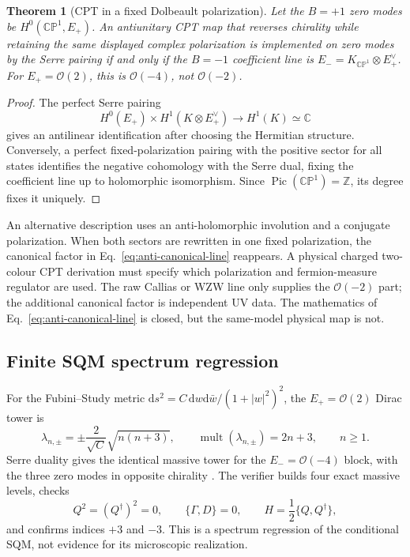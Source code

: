 \documentclass[11pt]{article}
\newtheorem{theorem}{Theorem}[section]
\theoremstyle{definition}
\theoremstyle{remark}
\newcommand{\dd}{\mathrm d}
\newcommand{\CC}{\mathbb C}
\newcommand{\ZZ}{\mathbb Z}
\newcommand{\CP}{\mathbb {CP}}
\newcommand{\cO}{\mathcal O}
\begin{document}
\begin{theorem}[CPT in a fixed Dolbeault polarization]
Let the \(B=+1\) zero modes be \(H^0(\CP^1,E_+)\).  An antiunitary CPT map
that reverses chirality while retaining the same displayed complex
polarization is implemented on zero modes by the Serre pairing if and only if
the \(B=-1\) coefficient line is
\(E_-=K_{\CP^1}\otimes E_+^\vee\).  For \(E_+=\cO(2)\), this is
\(\cO(-4)\), not \(\cO(-2)\).
\end{theorem}
\begin{proof}
The perfect Serre pairing
\begin{equation}
 H^0(E_+)\times H^1(K\otimes E_+^\vee)
 \longrightarrow H^1(K)\simeq\CC
 \label{eq:serre-pairing}
\end{equation}
gives an antilinear identification after choosing the Hermitian structure.
Conversely, a perfect fixed-polarization pairing with the positive sector for
all states identifies the negative cohomology with the Serre dual, fixing the
coefficient line up to holomorphic isomorphism.  Since
\(\operatorname{Pic}(\CP^1)=\ZZ\), its degree fixes it uniquely.
\end{proof}

An alternative description uses an anti-holomorphic involution and a
conjugate polarization.  When both sectors are rewritten in one fixed
polarization, the canonical factor in Eq.~\eqref{eq:anti-canonical-line}
reappears.  A physical charged two-colour CPT derivation must specify which
polarization and fermion-measure regulator are used.  The raw Callias or WZW
line only supplies the \(\cO(-2)\) part; the additional canonical factor is
independent UV data.  The mathematics of Eq.~\eqref{eq:anti-canonical-line}
is closed, but the same-model physical map is not.

\subsection{Finite SQM spectrum regression}

For the Fubini--Study metric
\(\dd s^2=C\,\dd w\dd\bar w/(1+|w|^2)^2\), the \(E_+=\cO(2)\) Dirac tower is
\begin{equation}
 \lambda_{n,\pm}
 =\pm\frac{2}{\sqrt C}\sqrt{n(n+3)},
 \qquad
 \operatorname{mult}(\lambda_{n,\pm})=2n+3,
 \qquad n\ge1.
 \label{eq:massive-spectrum}
\end{equation}
Serre duality gives the identical massive tower for the
\(E_-=\cO(-4)\) block, with the three zero modes in opposite chirality
\cite{BykovSmilga2023SameSoliton}.  The verifier builds four exact massive
levels, checks
\begin{equation}
 Q^2=(Q^\dagger)^2=0,
 \qquad \{\Gamma,D\}=0,
 \qquad H=\frac12\{Q,Q^\dagger\},
 \label{eq:sqm-algebra}
\end{equation}
and confirms indices \(+3\) and \(-3\).  This is a spectrum regression of
the conditional SQM, not evidence for its microscopic realization.
\end{document}
